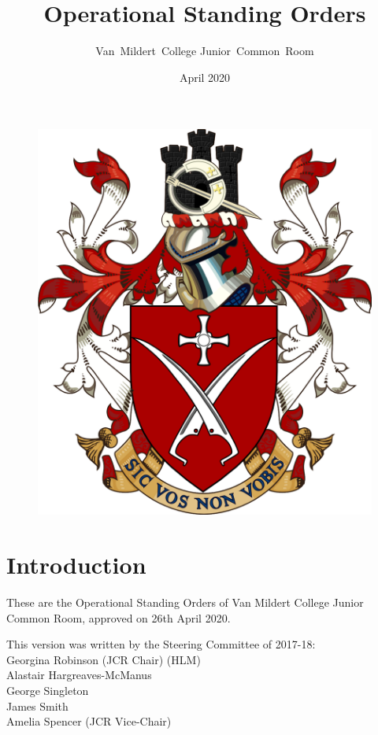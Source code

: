 \documentclass[12pt]{article}  %
\title{Operational Standing Orders}
\author{Van~Mildert~College Junior~Common~Room}
\date{April 2020}
\begin{document}
\begin{titlepage}  %
    \maketitle
    \begin{figure}[h]
    \includegraphics[scale=0.25]{arms}  %
    \centering
    \end{figure}
    \thispagestyle{empty}
\end{titlepage}

\setcounter{page}{2}  %
\section*{Introduction}
These are the Operational Standing Orders of Van Mildert College Junior Common Room, approved on 26th April 2020.

This version was written by the Steering Committee of 2017-18:\\
\hspace*{2cm}Georgina Robinson (JCR Chair) (HLM)\\
\hspace*{2cm}Alastair Hargreaves-McManus\\
\hspace*{2cm}George Singleton\\
\hspace*{2cm}James Smith\\
\hspace*{2cm}Amelia Spencer (JCR Vice-Chair)
\end{document}
